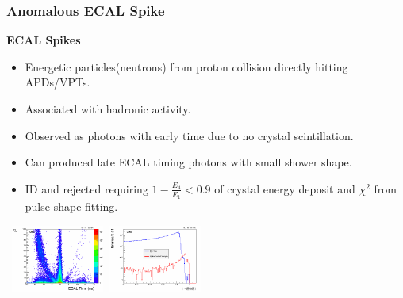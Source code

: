\documentclass{beamer}
\begin{document}
\begin{frame}
\frametitle{Anomalous ECAL Spike}
 \small{
 \begin{varblock}[7cm]{\textbf{ECAL Spikes}}
 \begin{itemize}
  \item Energetic particles(neutrons) from proton collision directly hitting APDs/VPTs.
  \item Associated with hadronic activity.
  \item Observed as photons with early time due to no crystal scintillation.
  \item Can produced late ECAL timing photons with small shower shape.
  \item ID and rejected requiring $1 - \frac{E_{4}}{E_{1}} < 0.9$ of crystal energy deposit and $\chi^{2}$ from pulse shape fitting.
 \end{itemize}
 \end{varblock}
 }
 \vspace{-0.2cm}
 \begin{tcolorbox}[colback=UNL@Cream!5,colframe=UMN@Maroon!40,title=\textcolor{UMN@Maroon}{\textbf{Spike Identification and Rejection}}]
 \mbox{ 
 \includegraphics[height=2.20cm,width=0.3\paperwidth]{THESISPLOTS/seedTime_Chi2.png} \quad \quad
 \includegraphics[height=2.20cm,width=0.3\paperwidth]{THESISPLOTS/swissX.png}
 } 
 \end{tcolorbox}
\end{frame}
\end{document}
